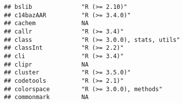 \documentclass[
]{article}
\begin{document}
\begin{verbatim}
## bslib              "R (>= 2.10)"                                                                                                                                                                                         
## c14bazAAR          "R (>= 3.4.0)"                                                                                                                                                                                        
## cachem             NA                                                                                                                                                                                                    
## callr              "R (>= 3.4)"                                                                                                                                                                                          
## class              "R (>= 3.0.0), stats, utils"                                                                                                                                                                          
## classInt           "R (>= 2.2)"                                                                                                                                                                                          
## cli                "R (>= 3.4)"                                                                                                                                                                                          
## clipr              NA                                                                                                                                                                                                    
## cluster            "R (>= 3.5.0)"                                                                                                                                                                                        
## codetools          "R (>= 2.1)"                                                                                                                                                                                          
## colorspace         "R (>= 3.0.0), methods"                                                                                                                                                                               
## commonmark         NA                                                                                                                                                                                                    

\end{verbatim}
\end{document}
